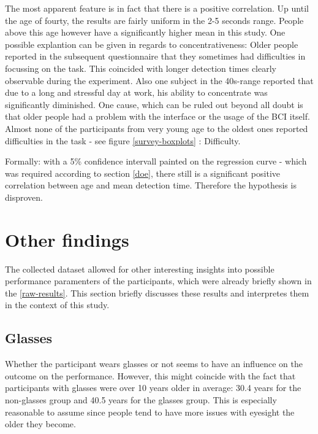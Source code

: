 
            The most apparent feature is in fact that there is a positive correlation. Up until the age of fourty, the results are fairly uniform in the 2-5 seconds range. People above this age however have a significantly higher mean in this study. One possible explantion can be given in regards to concentrativeness: Older people reported in the subsequent questionnaire that they sometimes had difficulties in focussing on the task. This coincided with longer detection times clearly observable during the experiment. Also one subject in the 40s-range reported that due to a long and stressful day at work, his ability to concentrate was significantly diminished. One cause, which can be ruled out beyond all doubt is that older people had a problem with the interface or the usage of the BCI itself. Almost none of the participants from very young age to the oldest ones reported difficulties in the task - see figure \ref*{survey-boxplots} : Difficulty.

            \medskip

            Formally: with a 5\% confidence intervall painted on the regression curve - which was required according to section \ref*{doe}, there still is a significant positive correlation between age and mean detection time. Therefore the hypothesis is disproven.

        \section{Other findings}\label{other-findings}

            The collected dataset allowed for other interesting insights into possible performance paramenters of the participants, which were already briefly shown in the \ref*{raw-results}. This section briefly discusses these results and interpretes them in the context of this study.

            \subsection{Glasses}

                Whether the participant wears glasses or not seems to have an influence on the outcome on the performance. However, this might coincide with the fact that participants with glasses were over 10 years older in average: 30.4 years for the non-glasses group and 40.5 years for the glasses group. This is especially reasonable to assume since people tend to have more issues with eyesight the older they become.  

